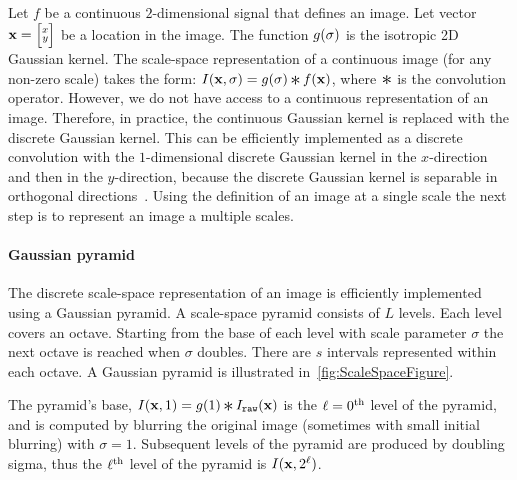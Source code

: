        Let $f$ be a continuous $2$-dimensional signal that defines an image. Let vector $\mathbf{x}= \Bigl[\negthinspace \begin{smallmatrix}  x\\ y \end{smallmatrix} \negthinspace \Bigr] $ be a
        location in the image. The function $g(\sigma)$
        is the isotropic 2D Gaussian kernel. The scale-space representation of a continuous image (for any non-zero
        scale) takes the form: $\img(\pt, \scale) = g(\scale) \conv f(\pt)$, where $\conv$ is the convolution
        operator. However, we do not have access to a continuous representation of an image. Therefore, in
        practice, the continuous Gaussian kernel is replaced with the discrete Gaussian kernel. This can be
        efficiently implemented as a discrete convolution with the $1$-dimensional discrete Gaussian kernel in the
        $x$-direction and then in the $y$-direction, because the discrete Gaussian kernel is separable in
        orthogonal directions~\cite{lindeberg_scale_space_1993}. Using the definition of an image at a single scale
        the next step is to represent an image a multiple scales.

       \paragraph{Gaussian pyramid}

           \newcommand{\downsamp}[2]{#1[::\tightpad#2,::\tightpad#2]}
            The discrete scale-space representation of an image is efficiently implemented using a Gaussian
            pyramid. A scale-space pyramid consists of $L$ levels. Each level covers an octave. Starting from the
            base of each level with scale parameter $\sigma$ the next octave is reached when $\sigma$ doubles.
            There are $s$ intervals represented within each octave. A Gaussian pyramid is illustrated
            in~\cref{fig:ScaleSpaceFigure}.

            \ScaleSpaceFigure{}

            The pyramid's base, %
            $\img(\pt, 1) = g( 1 ) \conv \rawimg(\pt)$ %
            is the $\ell=0^{\textrm{th}}{}$ level of the pyramid, and is computed by blurring the original image (sometimes
            with small initial blurring) with $\sigma=1$. Subsequent levels of the pyramid are produced by doubling
            sigma, thus the $\ell^{\textrm{th}}{}$ level of the pyramid is $I(\mathbf{x}, 2^\ell)$.

